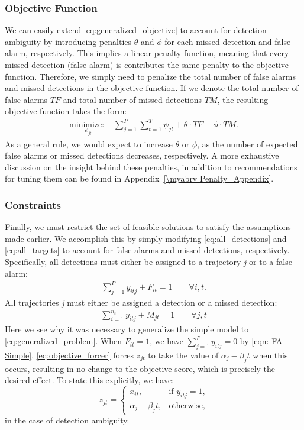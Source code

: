 \subsubsection{Objective Function}
We can easily extend \eqref{eq:generalized_objective} to account for detection ambiguity by introducing penalties $\theta$ and $\phi$ for each missed detection and false alarm, respectively. This implies a linear penalty function, meaning that every missed detection (false alarm) is contributes the same penalty to the objective function. Therefore, we simply need to penalize the total number of false alarms and missed detections in the objective function. If we denote the total number of false alarms $TF$ and total number of missed detections $TM$, the resulting objective function takes the form:
\begin{align*}
\underset{\psi_{jt}}{\text{minimize: }} & \sum_{j=1}^{P} \sum_{t=1}^{T} \psi_{jt} + \theta \cdot TF + \phi \cdot TM.
\end{align*}
As a general rule, we would expect to increase $\theta$ or $\phi$, as the number of expected false alarms or missed detections decreases, respectively. A more exhaustive discussion on the insight behind these penalties, in addition to recommendations for tuning them can be found in Appendix~\ref{\myabrv Penalty_Appendix}.

\subsubsection{Constraints}
Finally, we must restrict the set of feasible solutions to satisfy the assumptions made earlier. We accomplish this by simply modifying \eqref{eq:all_detections} and \eqref{eq:all_targets} to account for false alarms and missed detections, respectively. Specifically, all detections must either be assigned to a trajectory \textit{j} or to a false alarm:
\begin{align}\label{eqn: FA Simple}
\sum_{j=1}^{P} y_{itj} + F_{it} = 1 \qquad \forall i,t.
\end{align}
All trajectories \textit{j} must either be assigned a detection or a missed detection:
\begin{align}\label{eqn: MD Simple}
\sum_{i=1}^{n_{t}} y_{itj} + M_{jt} = 1 \qquad \forall j,t
\end{align}
Here we see why it was necessary to generalize the simple model to \eqref{eq:generalized_problem}. When $F_{it} = 1$, we have $\sum_{j=1}^{P} y_{itj} = 0$ by \eqref{eqn: FA Simple}. \eqref{eq:objective_forcer} forces $z_{jt}$ to take the value of $\alpha_{j} - \beta_{j}t$ when this occurs, resulting in no change to the objective score, which is precisely the desired effect. To state this explicitly, we have: 
\[z_{jt} =
\begin{cases}
x_{it}, & \text{if $y_{itj} = 1$,} \\
\alpha_{j} - \beta_{j}t, & \text{otherwise,}
\end{cases}\]
in the case of detection ambiguity. 

